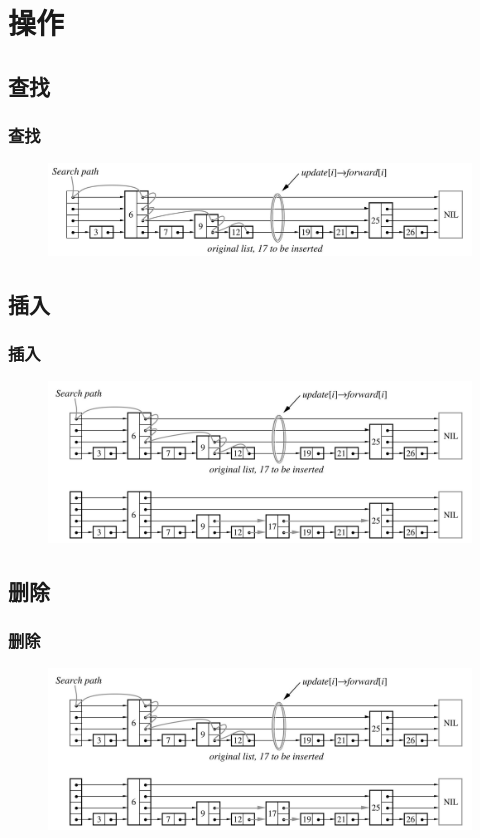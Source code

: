 \documentclass{beamer}
\begin{document}
	\section{操作}
	\subsection{查找}
	\begin{frame}
		\frametitle{查找}
		\begin{figure}[H]
			\includegraphics[scale=0.25]{./img/insert.jpg}
		\end{figure}
	\end{frame}

	\subsection{插入}
	\begin{frame}
		\frametitle{插入}
		\begin{figure}[H]
			\includegraphics[scale=0.2]{./img/find.jpg}
		\end{figure}
	\end{frame}
	\subsection{删除}
	\begin{frame}
		\frametitle{删除}
		\begin{figure}[H]
			\includegraphics[scale=0.2]{./img/find.jpg}
		\end{figure}
	\end{frame}
\end{document}
